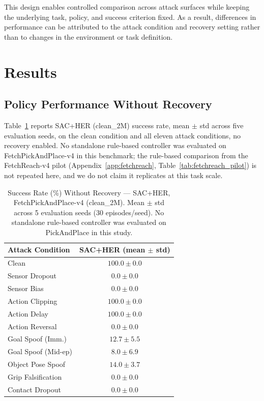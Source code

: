 \documentclass[conference]{IEEEtran}
\begin{document}
This design enables controlled comparison across attack surfaces while keeping the
underlying task, policy, and success criterion fixed. As a result, differences in
performance can be attributed to the attack condition and recovery setting rather than
to changes in the environment or task definition.


\section{Results}
\label{sec:results}

\subsection{Policy Performance Without Recovery}

Table~\ref{tab:pnp_no_recovery} reports SAC+HER (clean\_2M) success rate, mean $\pm$
std across five evaluation seeds, on the clean condition and all eleven attack
conditions, no recovery enabled. No standalone rule-based controller was evaluated on
FetchPickAndPlace-v4 in this benchmark; the rule-based comparison from the
FetchReach-v4 pilot (Appendix~\ref{app:fetchreach}, Table~\ref{tab:fetchreach_pilot})
is not repeated here, and we do not claim it replicates at this task scale.

\begin{table}[t]
\centering
\caption{Success Rate (\%) Without Recovery --- SAC+HER, FetchPickAndPlace-v4
(clean\_2M). Mean $\pm$ std across 5 evaluation seeds (30 episodes/seed). No
standalone rule-based controller was evaluated on PickAndPlace in this study.}
\label{tab:pnp_no_recovery}
\begin{tabular}{lc}
\toprule
\textbf{Attack Condition} & \textbf{SAC+HER (mean $\pm$ std)} \\
\midrule
Clean                 & $100.0 \pm 0.0$ \\
Sensor Dropout         & $0.0 \pm 0.0$ \\
Sensor Bias            & $0.0 \pm 0.0$ \\
Action Clipping        & $100.0 \pm 0.0$ \\
Action Delay           & $100.0 \pm 0.0$ \\
Action Reversal        & $0.0 \pm 0.0$ \\
Goal Spoof (Imm.)      & $12.7 \pm 5.5$ \\
Goal Spoof (Mid-ep)    & $8.0 \pm 6.9$ \\
Object Pose Spoof      & $14.0 \pm 3.7$ \\
Grip Falsification     & $0.0 \pm 0.0$ \\
Contact Dropout        & $0.0 \pm 0.0$ \\
\bottomrule
\end{tabular}
\end{table}
\end{document}

